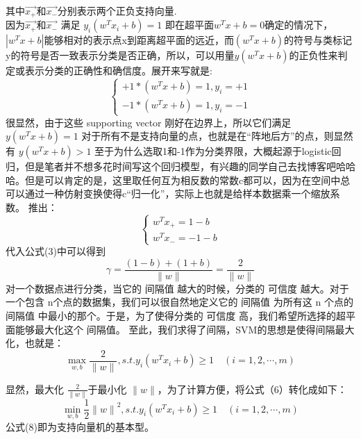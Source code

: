 \documentclass[UTF8]{article}
\begin{document}
{其中$\overrightarrow{x_+}$和$\overrightarrow{x_-}$分别表示两个正负支持向量.\\
因为$\overrightarrow{x_+}$和$\overrightarrow{x_-}$ 满足 $y_i(w^T x_i+b)=1$ 
即在超平面$w^T x+b=0$确定的情况下，$\left|w^T x+b\right|$能够相对的表示点x到距离超平面的远近，而$(w^Tx+b)$的符号与类标记y的符号是否一致表示分类是否正确，所以，可以用量$y(w^T x+b)$的正负性来判定或表示分类的正确性和确信度。展开来写就是:
\begin{equation}
\left\{
\begin{array}{lcl}
+1*(w^T x+b) = 1,y_i = +1\\
-1*(w^T x+b) = 1,y_i = -1
\end{array}
\right.
\end{equation}
很显然，由于这些 supporting vector 刚好在边界上，所以它们满足
$y(w^T x+b) = 1$
对于所有不是支持向量的点，也就是在“阵地后方”的点，则显然有
$y(w^T x+b) > 1$
至于为什么选取1和-1作为分类界限，大概起源于logistic回归，但是笔者并不想多花时间写这个回归模型，有兴趣的同学自己去找博客吧哈哈哈。但是可以肯定的是，这里取任何互为相反数的常数c都可以，因为在空间中总可以通过一种仿射变换使得c“归一化”，实际上也就是给样本数据乘一个缩放系数。
推出：
\begin{equation}
\left\{
\begin{array}{lcl}
\label{(3)}
w^T x_+ = 1-b\\
w^T x_- = -1-b
\end{array}
\right.
\end{equation}
代入公式(3)中可以得到
\begin{equation}
	\gamma = \frac{(1-b)+(1+b)}{\lVert w \rVert}=\frac{2}{\lVert w \rVert}
\end{equation}
对一个数据点进行分类，当它的 间隔值 越大的时候，分类的 可信度 越大。对于一个包含  n个点的数据集，我们可以很自然地定义它的 间隔值 为所有这 n 个点的 间隔值 中最小的那个。于是，为了使得分类的 可信度 高，我们希望所选择的超平面能够最大化这个 间隔值。
至此，我们求得了间隔，SVM的思想是使得间隔最大化，也就是：
\begin{equation}
\max\limits_{w,b}\frac{2}{\lVert w \rVert},s.t.y_i(w^T x_i+b)\ge 1\quad (i = 1,2,\cdots,m)
\end{equation}

显然，最大化 $\frac{2}{\lVert w\rVert}$于最小化 $\lVert w\rVert$，为了计算方便，将公式（6）转化成如下：
\begin{equation}
\min\limits_{w,b}\frac{1}{2}{\lVert w\rVert}^2,s.t.y_i(w^T x_i+b)\ge 1\quad (i = 1,2,\cdots,m)
\end{equation}
公式(8)即为支持向量机的基本型。

}
\end{document}
